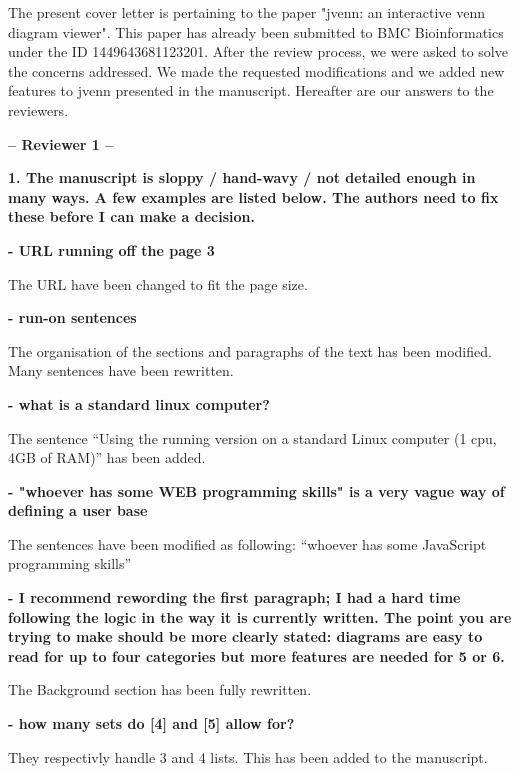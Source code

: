 \documentclass[10pt,stdletter,dateno,sigleft]{newlfm} %
\begin{document}
\begin{newlfm}


The present cover letter is pertaining to the paper "jvenn: an interactive venn
diagram viewer". This paper has already been submitted to BMC Bioinformatics 
under the ID 1449643681123201. After the review process, we were asked to
solve the concerns addressed. We made the requested modifications and we added 
new features to jvenn presented in the manuscript. Hereafter are our answers 
to the reviewers.



\textbf{-- Reviewer 1 --}

\textbf{1. The manuscript is sloppy / hand-wavy / not detailed enough in many
ways. A few examples are listed below. The authors need to fix these before I
can make a decision.}

\textbf{- URL running off the page 3}

The URL have been changed to fit the page size. 

\textbf{- run-on sentences}

The organisation of the sections and paragraphs of the text has been modified.
Many sentences have been rewritten.

\textbf{- what is a standard linux computer?}

The sentence ``Using the running version on a standard Linux computer (1 cpu,
4GB of RAM)'' has been added.

\textbf{- "whoever has some WEB programming skills" is a very vague way of
defining a user base}

The sentences have been modified as following: ``whoever has some JavaScript 
programming skills''

\textbf{- I recommend rewording the first paragraph; I had a hard time following
the logic in the way it is currently written. The point you are trying to make 
should be more clearly stated: diagrams are easy to read for up to four
categories but more features are needed for 5 or 6.}

The Background section has been fully rewritten.

\textbf{- how many sets do [4] and [5] allow for?}

They respectivly handle 3 and 4 lists. This has been added to the manuscript.



\end{newlfm}
\end{document}
